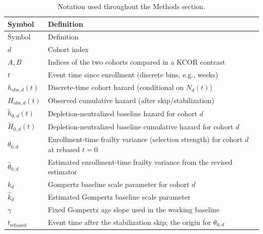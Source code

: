 \documentclass[
]{article}
\begin{document}
\begin{longtable}[]{@{}
  >{\raggedright\arraybackslash}p{}
  >{\raggedright\arraybackslash}p{}@{}}
\caption{Notation used throughout the Methods
section.}\label{tbl:notation}\tabularnewline
\toprule\noalign{}
\begin{minipage}[b]{\linewidth}\raggedright
Symbol
\end{minipage} & \begin{minipage}[b]{\linewidth}\raggedright
Definition
\end{minipage} \\
\midrule\noalign{}
\endfirsthead
\toprule\noalign{}
\begin{minipage}[b]{\linewidth}\raggedright
Symbol
\end{minipage} & \begin{minipage}[b]{\linewidth}\raggedright
Definition
\end{minipage} \\
\midrule\noalign{}
\endhead
\bottomrule\noalign{}
\endlastfoot
\(d\) & Cohort index \\
\(A,B\) & Indices of the two cohorts compared in a KCOR contrast \\
\(t\) & Event time since enrollment (discrete bins, e.g., weeks) \\
\(h_{\mathrm{obs},d}(t)\) & Discrete-time cohort hazard (conditional on
\(N_d(t)\)) \\
\(H_{\mathrm{obs},d}(t)\) & Observed cumulative hazard (after
skip/stabilization) \\
\(\tilde h_{0,d}(t)\) & Depletion-neutralized baseline hazard for cohort
\(d\) \\
\(\tilde H_{0,d}(t)\) & Depletion-neutralized baseline cumulative hazard
for cohort \(d\) \\
\(\theta_{0,d}\) & Enrollment-time frailty variance (selection strength)
for cohort \(d\) at rebased \(t=0\) \\
\(\hat{\theta}_{0,d}\) & Estimated enrollment-time frailty variance from
the revised estimator \\
\(k_d\) & Gompertz baseline scale parameter for cohort \(d\) \\
\(\hat{k}_d\) & Estimated Gompertz baseline scale parameter \\
\(\gamma\) & Fixed Gompertz age slope used in the working baseline \\
\(t_{\mathrm{rebased}}\) & Event time after the stabilization skip; the
origin for \(\theta_{0,d}\) \\

\end{longtable}
\end{document}
